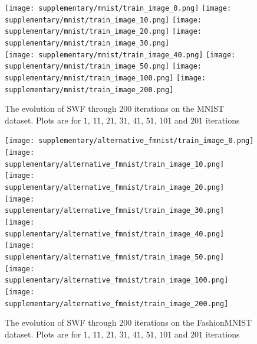 \begin{figure}
\centering
\texttt{[image: supplementary/mnist/train\_image\_0.png]}
\texttt{[image: supplementary/mnist/train\_image\_10.png]}
\texttt{[image: supplementary/mnist/train\_image\_20.png]}
\texttt{[image: supplementary/mnist/train\_image\_30.png]}\\
\texttt{[image: supplementary/mnist/train\_image\_40.png]}
\texttt{[image: supplementary/mnist/train\_image\_50.png]}
\texttt{[image: supplementary/mnist/train\_image\_100.png]}
\texttt{[image: supplementary/mnist/train\_image\_200.png]}
\caption{The evolution of SWF through 200 iterations on the MNIST dataset. Plots are for $1$, $11$, $21$, $31$, $41$, $51$, $101$ and $201$ iterations}
\label{fig:suppmnist}
\end{figure}

\begin{figure}
\centering
\texttt{[image: supplementary/alternative\_fmnist/train\_image\_0.png]}
\texttt{[image: supplementary/alternative\_fmnist/train\_image\_10.png]}
\texttt{[image: supplementary/alternative\_fmnist/train\_image\_20.png]}
\texttt{[image: supplementary/alternative\_fmnist/train\_image\_30.png]}\\
\texttt{[image: supplementary/alternative\_fmnist/train\_image\_40.png]}
\texttt{[image: supplementary/alternative\_fmnist/train\_image\_50.png]}
\texttt{[image: supplementary/alternative\_fmnist/train\_image\_100.png]}
\texttt{[image: supplementary/alternative\_fmnist/train\_image\_200.png]}
\caption{The evolution of SWF through 200 iterations on the FashionMNIST dataset. Plots are for $1$, $11$, $21$, $31$, $41$, $51$, $101$ and $201$ iterations}
\label{fig:suppfmnist}
\end{figure}










